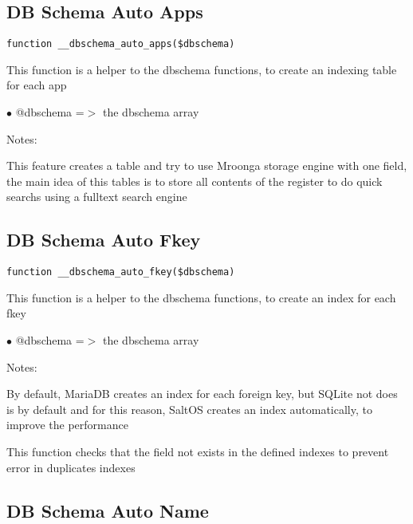 \documentclass[a4paper]{book}
\begin{document}
\hypertarget{toc96}{}
\subsection{DB Schema Auto Apps}

\begin{lstlisting}
function __dbschema_auto_apps($dbschema)
\end{lstlisting}

This function is a helper to the dbschema functions, to create an indexing table for each app

\begin{compactitem}
\item[\color{myblue}$\bullet$] @dbschema =$>$ the dbschema array
\end{compactitem}

Notes:

This feature creates a table and try to use Mroonga storage engine with one field, the main
idea of this tables is to store all contents of the register to do quick searchs using a
fulltext search engine

\hypertarget{toc97}{}
\subsection{DB Schema Auto Fkey}

\begin{lstlisting}
function __dbschema_auto_fkey($dbschema)
\end{lstlisting}

This function is a helper to the dbschema functions, to create an index for each fkey

\begin{compactitem}
\item[\color{myblue}$\bullet$] @dbschema =$>$ the dbschema array
\end{compactitem}

Notes:

By default, MariaDB creates an index for each foreign key, but SQLite not does is by default
and for this reason, SaltOS creates an index automatically, to improve the performance

This function checks that the field not exists in the defined indexes to prevent error in duplicates
indexes

\hypertarget{toc98}{}
\subsection{DB Schema Auto Name}
\end{document}
